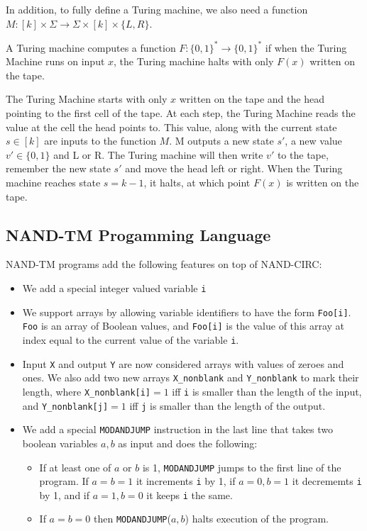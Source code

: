 \documentclass[11pt]{article}
\theoremstyle{definition}
\theoremstyle{remark}
\begin{document}
In addition, to fully define a Turing machine, we also need a function $M : [k] \times \Sigma \rightarrow   \Sigma \times [k] \times \{L, R\}$.

A Turing machine computes a function $F : \{0,1\}^* \rightarrow \{0,1\}^*$ if when the Turing Machine runs on input $x$, the Turing machine halts with only $F(x)$ written on the tape. 

The Turing Machine starts with only $x$ written on the tape and the head pointing to the first cell of the tape. At each step, the Turing Machine reads the value at the cell the head points to. This value, along with the current state $s \in [k]$ are inputs to the function $M$. M outputs a new state $s'$, a new value $v' \in \{0, 1\}$ and L or R. The Turing machine will then write $v'$ to the tape, remember the new state $s'$ and move the head left or right. When the Turing machine reaches state $s = k-1$, it halts, at which point $F(x)$ is written on the tape. 


\subsection{NAND-TM Progamming Language}
NAND-TM programs add the following features on top of NAND-CIRC:

\begin{itemize}

\item We add a special integer valued variable \texttt{i}

\item We support arrays by allowing variable identifiers to have the form \texttt{Foo[i]}. \texttt{Foo} is an array of Boolean values, and \texttt{Foo[i]} is the value of this array at index equal to the current value of the variable \texttt{i}.

\item Input \texttt{X} and output \texttt{Y} are now considered arrays with values of zeroes and ones. We also add two new arrays \texttt{X\_nonblank} and  \texttt{Y\_nonblank} to mark their length, where \texttt{X\_nonblank[i]}$=1$ iff \texttt{i} is smaller than the length of the input, and \texttt{Y\_nonblank[j]}$=1$ iff \texttt{j} is smaller than the length of the output.

\item We add a special \texttt{MODANDJUMP} instruction in the last line that takes two boolean variables $a,b$ as input and does the following:

\begin{itemize}
    \item If at least one of $a$ or $b$ is 1, \texttt{MODANDJUMP} jumps to the first line of the program. If $a=b=1$ it increments \texttt{i} by 1, if $a=0,b=1$ it decrememts \texttt{i} by 1, and if $a=1,b=0$ it keeps \texttt{i} the same.
    \item If $a=b=0$ then \texttt{MODANDJUMP}($a,b$) halts execution of the program.
\end{itemize}

\end{itemize}
\end{document}

